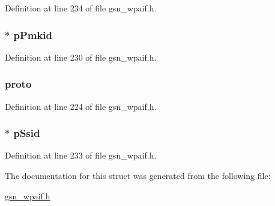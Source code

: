 Definition at line 234 of file gsn\_\-wpaif.h.

\hypertarget{a00420_a6c19c71297a0530d3d5e316108388183}{
\subsubsection[{pPmkid}]{$\ast$ {\bf pPmkid}}}
\label{a00420_a6c19c71297a0530d3d5e316108388183}


Definition at line 230 of file gsn\_\-wpaif.h.

\hypertarget{a00420_afbcc3671133d081aa615d5bf4985d90a}{
\subsubsection[{proto}]{ {\bf proto}}}
\label{a00420_afbcc3671133d081aa615d5bf4985d90a}


Definition at line 224 of file gsn\_\-wpaif.h.

\hypertarget{a00420_a6a1883676a18cb604743e02caaf42968}{
\subsubsection[{pSsid}]{$\ast$ {\bf pSsid}}}
\label{a00420_a6a1883676a18cb604743e02caaf42968}


Definition at line 233 of file gsn\_\-wpaif.h.



The documentation for this struct was generated from the following file:\begin{DoxyCompactItemize}
\item 
\hyperlink{a00615}{gsn\_\-wpaif.h}\end{DoxyCompactItemize}
